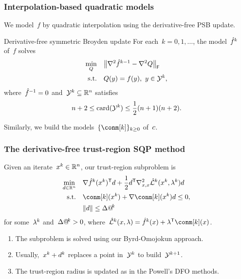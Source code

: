 \documentclass{polyu-presentation}
\makeatletter
\newcommand{\con}[1][]{c\ifthenelse{\equal{#1}{}}{}{_{#1}}}
\newcommand{\iter}[1][]{x\ifthenelse{\equal{#1}{}}{}{^{#1}}}
\newcommand{\lagm}[1][]{\hat{\mathcal{L}}\ifthenelse{\equal{#1}{}}{}{^{#1}}}
\newcommand{\lm}[1][]{\lambda\ifthenelse{\equal{#1}{}}{}{^{#1}}}
\newcommand{\obj}{f}
\newcommand{\objm}[1][]{\hat{f}\ifthenelse{\equal{#1}{}}{}{^{#1}}}
\newcommand{\rad}[1][]{\Delta\ifthenelse{\equal{#1}{}}{}{@\!^{#1}}}
\newcommand{\step}[1][]{d\ifthenelse{\equal{#1}{}}{}{^{#1}}}
\newcommand{\xpt}[1][]{\mathcal{Y}\ifthenelse{\equal{#1}{}}{}{^{#1}}}
\makeatother
\begin{document}
\begin{frame}
    \frametitle{Interpolation-based quadratic models}
    
	We model~$\obj$ by \alert{quadratic} interpolation using the derivative-free PSB update.

    \medskip

    \begin{block}{Derivative-free symmetric Broyden update \parencite{Powell_2004b}}
        For each~$k = 0, 1, \dots$, the model~$\objm[k]$ of~$\obj$ solves
        \begin{align*}
            \min_{Q}    & \quad \norm[\big]{\nabla^2 \objm[k - 1] - \nabla^2 Q}_{\mathsf{F}}\\
            \text{s.t.} & \quad Q(y) = \obj(y), ~ y \in \xpt[k],
        \end{align*}
        where~$\objm[-1] = 0$ and~$\xpt[k] \subseteq \R^n$ satisfies
        \begin{equation*}
            n + 2 \le \card(\xpt[k]) \le \frac{1}{2} (n + 1) (n + 2).
        \end{equation*}
    \end{block}

    \medskip

    Similarly, we build the models~$\set{\conm[k]}_{k \ge 0}$ of~$\con$.
\end{frame}

\begin{frame}
    \frametitle{The derivative-free trust-region SQP method}

    Given an iterate~$\iter[k] \in \R^n$, our \alert{trust-region} subproblem is
    \begin{align*}
        \min_{\step \in \R^n}   & \quad \nabla \objm[k](\iter[k])^{\T} \step + \frac{1}{2} \step^{\T} \nabla_{x, x}^2 \lagm[k](\iter[k], \lm[k]) \step\\
        \text{s.t.}             & \quad \conm[k](\iter[k]) + \nabla \conm[k](\iter[k]) \step \le 0,\\
                                & \quad \norm{\step} \le \rad[k]
    \end{align*}
    for some~$\lm[k]$ and~$\rad[k] > 0$, where~$\lagm[k](\iter, \lm) = \objm[k](\iter) + \lm^{\T} \conm[k](\iter)$.

    \bigskip

    \begin{block}{}
        \begin{enumerate}
            \item The subproblem is solved using our \alert{Byrd-Omojokun} approach.
            \item Usually,~$\iter[k] + \step[k]$ replaces a point in~$\xpt[k]$ to build~$\xpt[k + 1]$.
            \item The \alert{trust-region radius} is updated as in the Powell's DFO methods.
        \end{enumerate}
    \end{block}
\end{frame}
\end{document}
